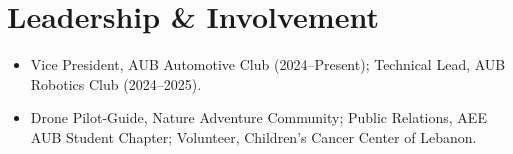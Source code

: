 \documentclass[letterpaper,11pt]{article}
\newcommand{\resumeItem}[1]{
  \item\small{
    {#1 \vspace{-2pt}}
  }
}
\newcommand{\resumeSubHeadingListStart}{\begin{itemize}[leftmargin=0.15in, label={}]}
\newcommand{\resumeSubHeadingListEnd}{\end{itemize}}
\newcommand{\resumeItemListStart}{\begin{itemize}}
\newcommand{\resumeItemListEnd}{\end{itemize}\vspace{-5pt}}
\begin{document}
\section{Leadership \& Involvement}
  \resumeSubHeadingListStart
    \resumeItemListStart
      \resumeItem{Vice President, AUB Automotive Club (2024--Present); Technical Lead, AUB Robotics Club (2024--2025).}
      \resumeItem{Drone Pilot-Guide, Nature Adventure Community; Public Relations, AEE AUB Student Chapter; Volunteer, Children's Cancer Center of Lebanon.}
    \resumeItemListEnd
  \resumeSubHeadingListEnd


\end{document}
